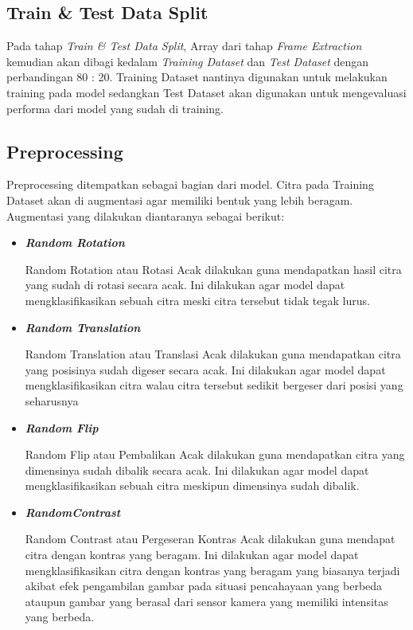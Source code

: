 \newpage
\subsection{Train \& Test Data Split}
\label{subsec:traintestsplit}

Pada tahap \textit{Train \& Test Data Split}, Array dari tahap \textit{Frame Extraction} kemudian akan dibagi kedalam \textit{Training Dataset} dan \textit{Test Dataset} dengan perbandingan 80 : 20. Training Dataset nantinya digunakan untuk melakukan training pada model sedangkan Test Dataset akan digunakan untuk mengevaluasi performa dari model yang sudah di training.

\subsection{Preprocessing}
\label{subsec:preprocessing}

Preprocessing ditempatkan sebagai bagian dari model. Citra pada Training Dataset akan di augmentasi agar memiliki bentuk yang lebih beragam. Augmentasi yang dilakukan diantaranya sebagai berikut:
\begin{itemize}
	\item \textit{\textbf{Random Rotation}}
	
	Random Rotation atau Rotasi Acak dilakukan guna mendapatkan hasil citra yang sudah di rotasi secara acak. Ini dilakukan agar model dapat mengklasifikasikan sebuah citra meski citra tersebut tidak tegak lurus.
	
	\item \textit{\textbf{Random Translation}}
	
	Random Translation atau Translasi Acak dilakukan guna mendapatkan citra yang posisinya sudah digeser secara acak. Ini dilakukan agar model dapat mengklasifikasikan citra walau citra tersebut sedikit bergeser dari posisi yang seharusnya
	
	\item \textit{\textbf{Random Flip}}
	
	Random Flip atau Pembalikan Acak dilakukan guna mendapatkan citra yang dimensinya sudah dibalik secara acak. Ini dilakukan agar model dapat mengklasifikasikan sebuah citra meskipun dimensinya sudah dibalik.
	
	\item \textit{\textbf{RandomContrast}}
	
	Random Contrast atau Pergeseran Kontras Acak dilakukan guna mendapat citra dengan kontras yang beragam. Ini dilakukan agar model dapat mengklasifikasikan citra dengan kontras yang beragam yang biasanya terjadi akibat efek pengambilan gambar pada situasi pencahayaan yang berbeda ataupun gambar yang berasal dari sensor kamera yang memiliki intensitas yang berbeda.
\end{itemize}

